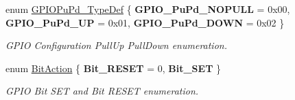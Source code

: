 \begin{DoxyCompactItemize}
\item 
\mbox{\label{group___g_p_i_o_gafb7ecd99c44b4fd702d669304a36c2c8}} 
enum \hyperlink{group___g_p_i_o_gafb7ecd99c44b4fd702d669304a36c2c8}{G\+P\+I\+O\+Pu\+Pd\+\_\+\+Type\+Def} \{ {\bfseries G\+P\+I\+O\+\_\+\+Pu\+Pd\+\_\+\+N\+O\+P\+U\+LL} = 0x00, 
{\bfseries G\+P\+I\+O\+\_\+\+Pu\+Pd\+\_\+\+UP} = 0x01, 
{\bfseries G\+P\+I\+O\+\_\+\+Pu\+Pd\+\_\+\+D\+O\+WN} = 0x02
 \}\begin{DoxyCompactList}\small\item\em G\+P\+IO Configuration Pull\+Up Pull\+Down enumeration. \end{DoxyCompactList}
\item 
\mbox{\label{group___g_p_i_o_ga176130b21c0e719121470a6042d4cf19}} 
enum \hyperlink{group___g_p_i_o_ga176130b21c0e719121470a6042d4cf19}{Bit\+Action} \{ {\bfseries Bit\+\_\+\+R\+E\+S\+ET} = 0, 
{\bfseries Bit\+\_\+\+S\+ET}
 \}\begin{DoxyCompactList}\small\item\em G\+P\+IO Bit S\+ET and Bit R\+E\+S\+ET enumeration. \end{DoxyCompactList}
\end{DoxyCompactItemize}
